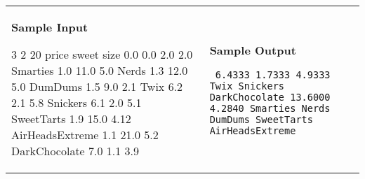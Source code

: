 \documentclass[11pt]{article}
\begin{document}
\vspace{0.25in}\hspace{-0.3in}\begin{tabular}{ll}

\parbox{3in}{{\large\bf Sample Input}

\vspace{0.15in}

{\tt 

3 2 20\linebreak
price sweet size 0.0 0.0 2.0 2.0\linebreak
Smarties 1.0 11.0 5.0\linebreak
Nerds 1.3 12.0 5.0\linebreak
DumDums 1.5 9.0 2.1\linebreak
Twix 6.2 2.1 5.8\linebreak
Snickers 6.1 2.0 5.1\linebreak
SweetTarts 1.9 15.0 4.12\linebreak
AirHeadsExtreme 1.1 21.0 5.2\linebreak
DarkChocolate 7.0 1.1 3.9\linebreak

}
}

&

\parbox{3in}{{\large\bf Sample Output}

\vspace{0.15in}

{\tt
6.4333 1.7333 4.9333\linebreak
Twix\linebreak
Snickers\linebreak
DarkChocolate 13.6000 4.2840\linebreak
Smarties\linebreak
Nerds\linebreak
DumDums\linebreak
SweetTarts\linebreak
AirHeadsExtreme\linebreak
}

}

\\
\end{tabular}
\end{document}
